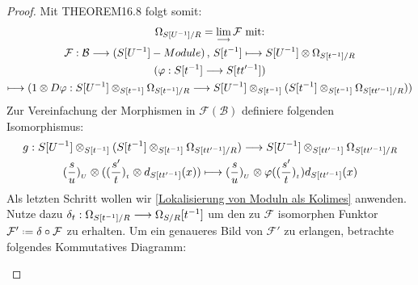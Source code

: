 \documentclass[10pt,a4paper]{report}
\newcommand{\comment}[1]{}
\newcommand{\functionfront}[3]{\nolinebreak{#1:#2 \longrightarrow #3}}
\newcommand{\function}[5]{\nolinebreak{#1:#2 \longrightarrow #3 \, , \, #4 \longmapsto #5}}
\newcommand{\divR}[2]{\Omega_{#1/#2}}
\newcommand{\divf}[1]{d_{#1}}
\newcommand{\Tensor}[3]{#1 \otimes_{#2} #3}
\newcommand{\tensor}[3]{#1 \otimes #3}
\newcommand{\lok}[2]{#1 [#2^{-1}]}
\newcommand{\loke}[3]{(\frac{#1}{#2})_{_{#3}}}
\newcommand{\colimes}[0]{\lim\limits_{ \longrightarrow }}
\newcommand*{\defeq}{\mathrel{\vcenter{\baselineskip0.5ex \lineskiplimit0pt
                     \hbox{\scriptsize.}\hbox{\scriptsize.}}}%
                     =}
\begin{document}
\begin{proof}
Mit THEOREM16.8 \comment{\label{THEOREM16.8}} folgt somit:
\begin{gather*}
\divR{\lok{S}{U}}{R}  = \colimes{\mathcal{F}} \text{ mit:}\\
\function{\mathcal{F}}{\mathcal{B}}{(\lok{S}{U} - Module)}{\lok{S}{t}}{\tensor{\lok{S}{U}}{\lok{S}{t}}{\divR{\lok{S}{t}}{R}}}\\
( \functionfront{\varphi}{\lok{S}{t}}{\lok{S}{tt'}} )\\ \longmapsto 
( \functionfront{\tensor{1}{\lok{S}{t}}{D\varphi}}{ \Tensor{\lok{S}{U}}{\lok{S}{t}}{\divR{\lok{S}{t}}{R}}}{ \Tensor{\lok{S}{U}}{\lok{S}{t}}{( \Tensor{\lok{S}{t}}{\lok{S}{t}}{\divR{\lok{S}{tt'}}{R}})}} )
\end{gather*}
Zur Vereinfachung der Morphismen in $\mathcal{F}(\mathcal{B})$ definiere folgenden Isomorphismus:
\begin{gather*}
\functionfront{g}{ \Tensor{\lok{S}{U}}{\lok{S}{t}}{( \Tensor{\lok{S}{t}}{\lok{S}{t}}{\divR{\lok{S}{tt'}}{R}})}}{\Tensor{\lok{S}{U}}{\lok{S}{tt'}}{\divR{\lok{S}{tt'}}{R}}}\\
\tensor{\loke{s}{u}{U}}{\lok{S}{t}}{( \tensor{\loke{s'}{t}{t}}{\lok{S}{t}}{\divf{\lok{S}{tt'}}(x)} )} 
\longmapsto \tensor{\loke{s}{u}{U}}{\lok{S}{tt'}}{\varphi(\loke{s'}{t}{t})\divf{\lok{S}{tt'}}(x)}
\end{gather*}
Als letzten Schritt wollen wir \cref{Lokalisierung von Moduln als Kolimes} anwenden. Nutze dazu $\functionfront{\delta_t}{\divR{\lok{S}{t}}{R}}{\lok{\divR{S}{R}}{t}}$ um den zu $\mathcal{F}$ isomorphen Funktor $\mathcal{F'} \defeq \delta \circ \mathcal{F}$ zu erhalten. Um ein genaueres Bild von $\mathcal{F'}$ zu erlangen, betrachte folgendes Kommutatives Diagramm:
\begin{center}
\end{center}
\end{proof}
\end{document}
